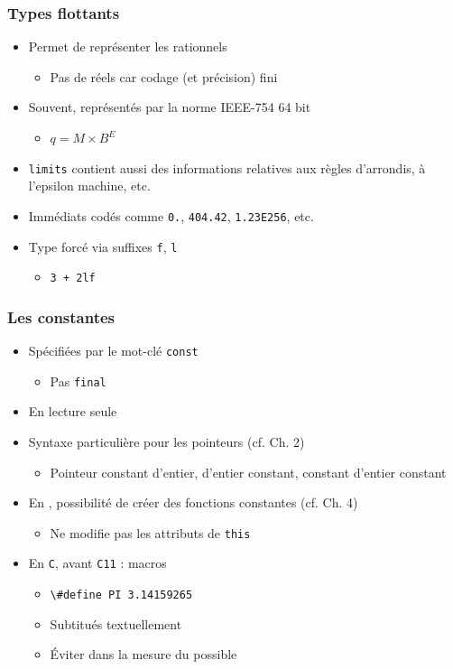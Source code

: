 \begin{frame}
\frametitle{Types flottants}
\begin{itemize}[<+->]
\item Permet de représenter les rationnels
	\begin{itemize}
	\item Pas de réels car codage (et précision) fini
	\end{itemize}
\item Souvent, représentés par la norme IEEE-754 64 bit
	\begin{itemize}
	\item $q = M \times B^E$
	\end{itemize}
\item \texttt{limits} contient aussi des informations relatives aux règles d'arrondis, à l'epsilon machine, etc.
\item Immédiats codés comme \texttt{0.}, \texttt{404.42}, \texttt{1.23E256}, etc.
\item Type forcé via suffixes \texttt{f}, \texttt{l}
	\begin{itemize}
	\item \texttt{3 + 2lf}
	\end{itemize}
\end{itemize}
\end{frame}

\begin{frame}
\frametitle{Les constantes}
\begin{itemize}[<+->]
\item Spécifiées par le mot-clé \lstinline|const|
	\begin{itemize}
	\item Pas \lstinline|final|
	\end{itemize}
\item En lecture seule
\item Syntaxe particulière pour les pointeurs (cf. Ch. 2)
	\begin{itemize}
	\item Pointeur constant d'entier, d'entier constant, constant d'entier constant
	\end{itemize}
\item En \cpp, possibilité de créer des fonctions constantes (cf. Ch. 4)
	\begin{itemize}
	\item Ne modifie pas les attributs de \lstinline|this|
	\end{itemize}
\item En \texttt{C}, avant \texttt{C11} : macros
	\begin{itemize}
	\item \lstinline|\#define PI 3.14159265|
	\item Subtitués textuellement
	\item Éviter dans la mesure du possible
	\end{itemize}
\end{itemize}
\end{frame}

